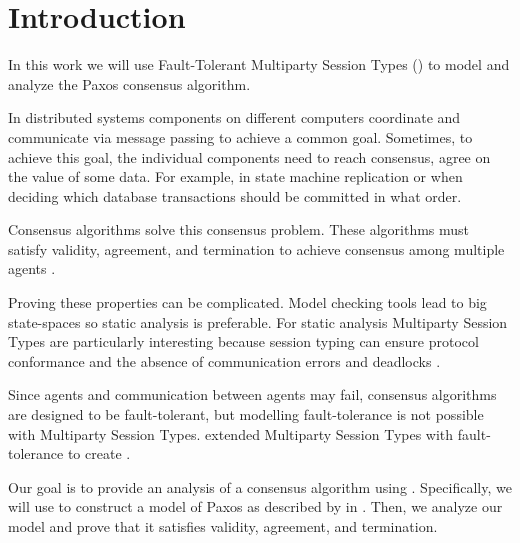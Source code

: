 \chapter{Introduction}
In this work we will use Fault-Tolerant Multiparty Session Types (\FTMPST) to model and analyze the Paxos consensus algorithm.

In distributed systems components on different computers coordinate and communicate via message passing to achieve a common goal.
Sometimes, to achieve this goal, the individual components need to reach consensus, \ie agree on the value of some data.
For example, in state machine replication or when deciding which database transactions should be committed in what order.

Consensus algorithms solve this consensus problem.
These algorithms must satisfy validity, agreement, and termination to achieve consensus among multiple agents \cite{CoulourisEtal01}.

Proving these properties can be complicated.
Model checking tools lead to big state-spaces so static analysis is preferable.
For static analysis Multiparty Session Types are particularly interesting because session typing can ensure protocol conformance and the absence of communication errors and deadlocks \cite{ScalasEtal18}.

Since agents and communication between agents may fail, consensus algorithms are designed to be fault-tolerant, but modelling fault-tolerance is not possible with Multiparty Session Types.
\citeauthor{PetersEtal21} extended Multiparty Session Types with fault-tolerance to create \FTMPST.

Our goal is to provide an analysis of a consensus algorithm using \FTMPST.
Specifically, we will use \FTMPST to construct a model of Paxos as described by \citeauthor{Lamport01} in \cite{Lamport01}.
Then, we analyze our model and prove that it satisfies validity, agreement, and termination.

